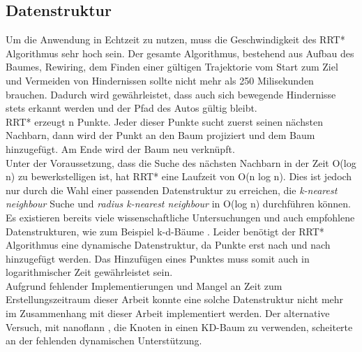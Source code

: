 \subsection{Datenstruktur}
Um die Anwendung in Echtzeit zu nutzen, muss die Geschwindigkeit des RRT* Algorithmus sehr hoch sein. Der gesamte Algorithmus, bestehend aus Aufbau des Baumes, Rewiring, dem Finden einer gültigen Trajektorie vom Start zum Ziel und Vermeiden von Hindernissen sollte nicht mehr als 250 Milisekunden brauchen. Dadurch wird gewährleistet, dass auch sich bewegende Hindernisse stets erkannt werden und der Pfad des Autos gültig bleibt. \\
RRT* erzeugt n Punkte. Jeder dieser Punkte sucht zuerst seinen nächsten Nachbarn, dann wird der Punkt an den Baum projiziert und dem Baum hinzugefügt. Am Ende wird der Baum neu verknüpft. \\
Unter der Voraussetzung, dass die Suche des nächsten Nachbarn in der Zeit O(log n) zu bewerkstelligen ist, hat RRT* eine Laufzeit von O(n log n). Dies ist jedoch nur durch die Wahl einer passenden Datenstruktur zu erreichen, die \textit{k-nearest neighbour} Suche und \textit{radius k-nearest neighbour} in O(log n) durchführen können.\\
Es existieren bereits viele wissenschaftliche Untersuchungen und auch empfohlene Datenstrukturen, wie zum Beispiel k-d-Bäume \citep{Bentley75}. Leider benötigt der RRT* Algorithmus eine dynamische Datenstruktur, da Punkte erst nach und nach hinzugefügt werden. Das Hinzufügen eines Punktes muss somit auch in logarithmischer Zeit gewährleistet sein. \\

Aufgrund fehlender Implementierungen und Mangel an Zeit zum Erstellungszeitraum dieser Arbeit konnte eine solche Datenstruktur nicht mehr im Zusammenhang mit dieser Arbeit implementiert werden. Der alternative Versuch, mit nanoflann \citep{blanco2014nanoflann}, die Knoten in einen KD-Baum zu verwenden, scheiterte an der fehlenden dynamischen Unterstützung.\\

